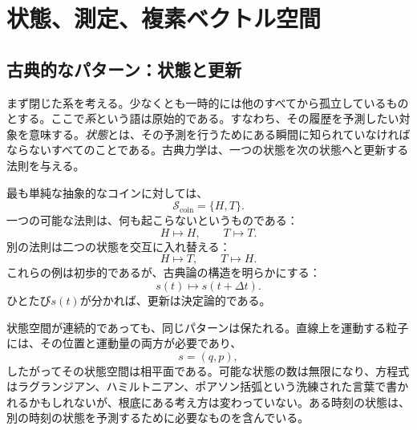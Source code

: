 \chapter{状態、測定、複素ベクトル空間}


\section{古典的なパターン：状態と更新}

まず閉じた系を考える。少なくとも一時的には他のすべてから孤立しているものとする。ここで\emph{系}という語は原始的である。すなわち、その履歴を予測したい対象を意味する。\emph{状態}とは、その予測を行うためにある瞬間に知られていなければならないすべてのことである。古典力学は、一つの状態を次の状態へと更新する法則を与える。

最も単純な抽象的なコインに対しては、
\begin{equation}
  \mathcal S_{\mathrm{coin}}=\{H,T\}.
\end{equation}
一つの可能な法則は、何も起こらないというものである：
\begin{equation}
  H\longmapsto H,
  \qquad
  T\longmapsto T.
\end{equation}
別の法則は二つの状態を交互に入れ替える：
\begin{equation}
  H\longmapsto T,
  \qquad
  T\longmapsto H.
\end{equation}
これらの例は初歩的であるが、古典論の構造を明らかにする：
\begin{equation}
  s(t)\longmapsto s(t+\Delta t).
\end{equation}
ひとたび\(s(t)\)が分かれば、更新は決定論的である。

状態空間が連続的であっても、同じパターンは保たれる。直線上を運動する粒子には、その位置と運動量の両方が必要であり、
\begin{equation}
  s=(q,p),
\end{equation}
したがってその状態空間は相平面である。可能な状態の数は無限になり、方程式はラグランジアン、ハミルトニアン、ポアソン括弧という洗練された言葉で書かれるかもしれないが、根底にある考え方は変わっていない。ある時刻の状態は、別の時刻の状態を予測するために必要なものを含んでいる。

